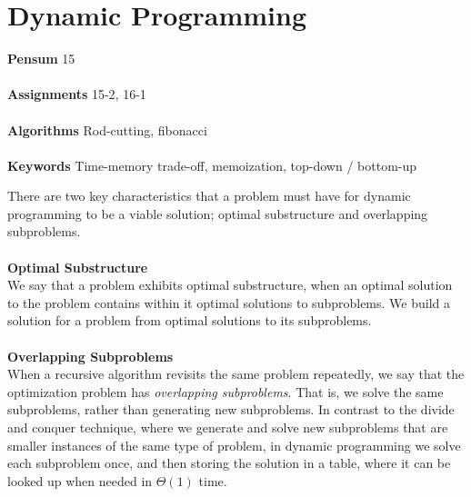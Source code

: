
\chapter{Dynamic Programming}
\label{ch:dynamicprogramming}

\textbf{Pensum} 15 \cite{clrs} \\\\
\textbf{Assignments} 15-2, 16-1 \\\\
\textbf{Algorithms} Rod-cutting, fibonacci \\\\
\textbf{Keywords} Time-memory trade-off, memoization, top-down / bottom-up
\vspace{1in}

\noindent There are two key characteristics that a problem must have for
dynamic programming to be a viable solution; optimal substructure and
overlapping subproblems.
\\\\
\noindent \textbf{Optimal Substructure}\\
We say that a problem exhibits optimal substructure, when an optimal solution
to the problem contains within it optimal solutions to subproblems. We build
a solution for a problem from optimal solutions to its subproblems.
\\\\
\noindent \textbf{Overlapping Subproblems}\\
When a recursive algorithm revisits the same problem repeatedly, we say that
the optimization problem has \textit{overlapping subproblems}. That is, we
solve the same subproblems, rather than generating new subproblems. In
contrast to the divide and conquer technique, where we generate and solve new
subproblems that are smaller instances of the same type of problem, in dynamic
programming we solve each subproblem once, and then storing the solution in a
table, where it can be looked up when needed in $\Theta(1)$ time.

\newpage
